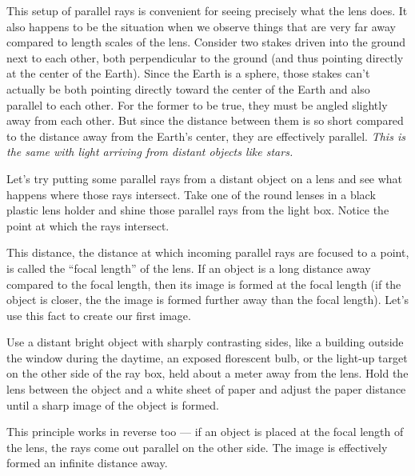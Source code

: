 This setup of parallel rays is convenient for seeing precisely what the lens does. It also happens to be the situation when we observe things that are very far away compared to length scales of the lens. Consider two stakes driven into the ground next to each other, both perpendicular to the ground (and thus pointing directly at the center of the Earth). Since the Earth is a sphere, those stakes can't actually be both pointing directly toward the center of the Earth and also parallel to each other. For the former to be true, they must be angled slightly away from each other. But since the distance between them is so short compared to the distance away from the Earth's center, they are effectively parallel. \textit{This is the same with light arriving from distant objects like stars.}

\begin{steps}
	\item Let's try putting some parallel rays from a distant object on a lens and see what happens where those rays intersect. Take one of the round lenses in a black plastic lens holder and shine those parallel rays from the light box. Notice the point at which the rays intersect.
\end{steps}

This distance, the distance at which incoming parallel rays are focused to a point, is called the ``focal length'' of the lens. If an object is a long distance away compared to the focal length, then its image is formed at the focal length (if the object is closer, the the image is formed further away than the focal length). Let's use this fact to create our first image.

\begin{steps}
	\item Use a distant bright object with sharply contrasting sides, like a building outside the window during the daytime, an exposed florescent bulb, or the light-up target on the other side of the ray box, held about a meter away from the lens. Hold the lens between the object and a white sheet of paper and adjust the paper distance until a sharp image of the object is formed.
	
\end{steps}

This principle works in reverse too --- if an object is placed at the focal length of the lens, the rays come out parallel on the other side. The image is effectively formed an infinite distance away.

